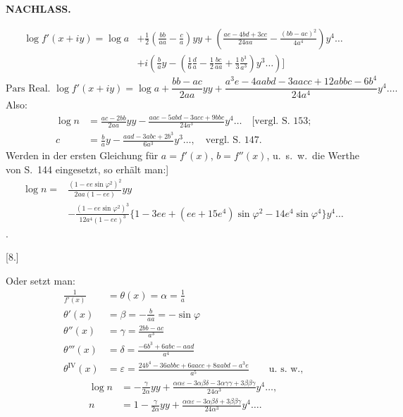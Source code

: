 \par\clearpage
\noindent{}\hfill{\small\textbf{NACHLASS.}}\hfill\null\par\medskip

\[
\begin{aligned}
\log f'(x+iy)=\log a
 &+\tfrac12\left(\frac{bb}{aa}-\frac ca\right)yy
 +\left(\frac{ae-4bd+3cc}{24aa}-\frac{(bb-ac)^2}{4a^4}\right)y^4\ldots\\
 &+i\left(\frac ba y-\left(\tfrac16\frac da-\tfrac12\frac{bc}{aa}
 +\tfrac13\frac{b^3}{a^3}\right)y^3\ldots\right)\mathclose{]}
\end{aligned}
\]
\[
\text{Pars Real. }\log f'(x+iy)=\log a+\frac{bb-ac}{2aa}yy
+\frac{a^3e-4aabd-3aacc+12abbc-6b^4}{24a^4}y^4\ldots.
\]
\noindent Also:
\[
\begin{aligned}
\log n&=\frac{ac-2bb}{2aa}yy-\frac{aae-5abd-3acc+9bbc}{24a^3}y^4\ldots
 \quad\text{[vergl. S.\ 153;}\\
c&=\frac ba y-\frac{aad-3abc+2b^3}{6a^3}y^3\ldots,
 \quad\text{vergl. S.\ 147.}
\end{aligned}
\]
\noindent Werden in der ersten Gleichung für \(a=f'(x)\), \(b=f''(x)\), u.\ s.\ w.\
die Werthe von S.\ 144 eingesetzt, so erhält man:]
\[
\begin{aligned}
\log n={}&\frac{(1-ee\sin\varphi^2)^2}{2aa(1-ee)}yy\\
 &-\frac{(1-ee\sin\varphi^2)^3}{12a^4(1-ee)^3}
 \{1-3ee+(ee+15e^4)\sin\varphi^2-14e^4\sin\varphi^4\}y^4\ldots
\end{aligned}
\]
.

\begin{center}[8.]\end{center}
Oder setzt man:
\[
\begin{aligned}
\frac1{f'(x)}&=\theta(x)=\alpha=\frac1a\\
\theta'(x)&=\beta=-\frac b{aa}=-\sin\varphi\\
\theta''(x)&=\gamma=\frac{2bb-ac}{a^3}\\
\theta'''(x)&=\delta=\frac{-6b^3+6abc-aad}{a^4}\\
\theta^{\mathrm{IV}}(x)&=\varepsilon
=\frac{24b^4-36abbc+6aacc+8aabd-a^3e}{a^5}\qquad\text{u.\ s.\ w.,}
\end{aligned}
\]
\noindent [so wird]
\[
\begin{aligned}
\log n&=-\frac{\gamma}{2\alpha}yy+
 \frac{\alpha\alpha\varepsilon-3\alpha\beta\delta-3\alpha\gamma\gamma+3\beta\beta\gamma}{24\alpha^3}
 y^4\ldots,\\
n&=1-\frac{\gamma}{2\alpha}yy+
 \frac{\alpha\alpha\varepsilon-3\alpha\beta\delta+3\beta\beta\gamma}{24\alpha^3}
 y^4\ldots.
\end{aligned}
\]

